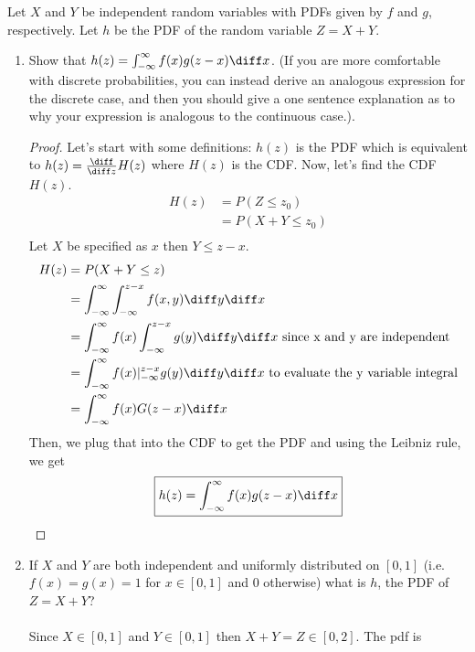 \documentclass{article}
\begin{document}
\newpage
\begin{aprob}
    Let $X$ and $Y$ be independent random variables with PDFs given by $f$ and $g$, respectively.
    Let $h$ be the PDF of the random variable $Z = X+Y$.
    \begin{enumerate}
        \item {} Show that $h(z) = \int_{-\infty}^\infty f(x) g( z - x ) \diff x $.  (If you are more comfortable with discrete probabilities, you can instead derive an analogous expression for the discrete case,  and then you should give a one sentence explanation as to why your expression is analogous to the continuous case.).
        \begin{proof}
            Let's start with some definitions: $h(z)$ is the PDF which is equivalent to $h(z)= \frac{\diff}{\diff z} H(z) $ where $ H(z) $ is the CDF. 
            Now, let's find the CDF $H(z)$.
            \begin{align*}
                H(z) &= P(Z \leq z_0) \\
                &= P(X+Y \leq z_0) \\
            \end{align*}
            Let $X$ be specified as $x$ then $Y \leq z - x $.
            \begin{align*}
                H(z) &= P(X+Y \leq z) \\
                &= \int_{-\infty}^{\infty} \int_{-\infty}^{z-x} f(x,y) \diff y \diff x \\
                &= \int_{-\infty}^{\infty} f(x) \int_{-\infty}^{z-x} g(y) \diff y \diff x \text{ since x and y are independent} \\
                &= \int_{-\infty}^{\infty} f(x) |^{z-x}_{-\infty} g(y) \diff y \diff x \text{ to evaluate the y variable integral} \\
                &= \int_{-\infty}^{\infty} f(x) G(z-x) \diff x
            \end{align*}
            Then, we plug that into the CDF to get the PDF and using the Leibniz rule, we get
            \[ \boxed{h(z) = \int_{-\infty}^\infty f(x) g( z - x ) \diff x }\]
        \end{proof}
        \newpage
        \item {} If $X$ and $Y$ are both independent and uniformly distributed on $[0,1]$ (i.e. $f(x)=g(x)=1$ for $x \in [0,1]$ and $0$ otherwise) what is $h$, the PDF of $Z=X+Y$?
        \\ \\
        Since $X \in [0,1]$ and $Y \in [0,1]$ then $X+Y=Z \in [0,2]$. The pdf is 

\end{enumerate}
\end{aprob}
\end{document}

